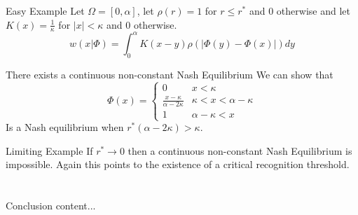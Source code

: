 \documentclass{beamer}
\begin{document}
\begin{frame}{Easy Example}
	Let $\Omega = [0,\alpha]$, let $\rho(r)=1$ for $r\leq r^*$ and $0$ otherwise and let $K(x)=\frac{1}{\kappa}$ for $|x|<\kappa$ and $0$ otherwise. 
	\begin{equation}
		w(x|\Phi)=\int_0^\alpha K(x-y)\rho(|\Phi(y)-\Phi(x)|)dy
	\end{equation} 

	\begin{block}{There exists a continuous non-constant Nash Equilibrium}
		We can show that 
		\begin{equation}
			\Phi(x)=\begin{cases}
					0&x<\kappa\\
					\frac{x-\kappa}{\alpha-2\kappa}&\kappa<x<\alpha-\kappa\\
					1&\alpha-\kappa<x
			\end{cases}
		\end{equation}
		Is a Nash equilibrium when $r^*(\alpha-2\kappa)>\kappa$. 
	\end{block}
\end{frame}

\begin{frame}{Limiting Example}
	If $r^*\rightarrow0$ then a continuous non-constant Nash Equilibrium is impossible. Again this points to the existence of a critical recognition threshold. 
\end{frame}

\section*{}
\begin{frame}{Conclusion}
	content...
\end{frame}
\end{document}
